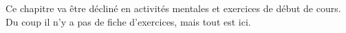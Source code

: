 


Ce chapitre va être décliné en activités mentales et exercices de début de cours. Du coup il n'y a pas de fiche d'exercices, mais tout est ici.


